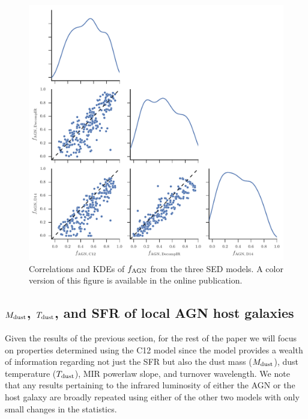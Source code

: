 \documentclass[fleqn, usenatbib]{mnras}
\begin{document}
\begin{figure}
\includegraphics{figures/agn_frac-comparison}
\caption{Correlations and KDEs of $f_{\rm AGN}$ from the three SED models.  A color version of this figure is available in the online publication. \label{fig:agn_frac_comp}}
\end{figure}

\subsection{$M_{\rm dust}$, $T_{\rm dust}$, and SFR of local AGN host galaxies}
Given the results of the previous section, for the rest of the paper we will focus on properties determined using the C12 model since the model provides a wealth of information regarding not just the SFR but also the dust mass ($M_{\rm dust}$), dust temperature ($T_{\rm dust}$), MIR powerlaw slope, and turnover wavelength. We note that any results pertaining to the infrared luminosity of either the AGN or the host galaxy are broadly repeated using either of the other two models with only small changes in the statistics.
\end{document}
